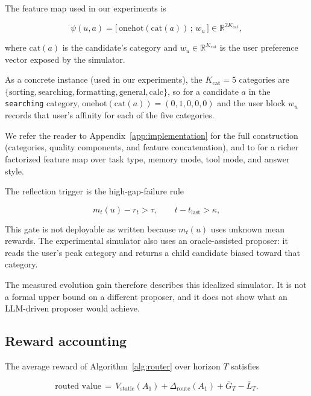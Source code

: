 \documentclass{article} %
\begin{document}
The feature map used in our experiments is

\begin{equation}
\label{eq:method-feat}
\psi(u,a) = \big[\,\mathrm{onehot}(\mathrm{cat}(a))\,;\, w_u\,\big] \in \mathbb{R}^{2K_{\mathrm{cat}}},
\end{equation}

where $\mathrm{cat}(a)$ is the candidate's category and $w_u \in \mathbb{R}^{K_{\mathrm{cat}}}$ is the user preference vector exposed by the simulator.

As a concrete instance (used in our experiments), the $K_{\mathrm{cat}}=5$ categories are $\{\text{sorting}, \text{searching}, \text{formatting}, \text{general}, \text{calc}\}$, so for a candidate $a$ in the \texttt{searching} category, $\mathrm{onehot}(\mathrm{cat}(a))=(0,1,0,0,0)$ and the user block $w_u$ records that user's affinity for each of the five categories.

We refer the reader to Appendix~\ref{app:implementation} for the full construction (categories, quality components, and feature concatenation), and to \citet{jin2026personalizing} for a richer factorized feature map over task type, memory mode, tool mode, and answer style.

The reflection trigger is the high-gap-failure rule

\begin{equation}
\label{eq:method-trigger}
m_t(u) - r_t > \tau,\qquad t - t_{\mathrm{last}} > \kappa,
\end{equation}

This gate is not deployable as written because $m_t(u)$ uses unknown mean rewards. The experimental simulator also uses an oracle-assisted proposer: it reads the user's peak category and returns a child candidate biased toward that category.

The measured evolution gain therefore describes this idealized simulator. It is not a formal upper bound on a different proposer, and it does not show what an LLM-driven proposer would achieve.

\subsection{Reward accounting}
The average reward of Algorithm~\ref{alg:router} over horizon $T$ satisfies

\begin{equation}
\label{eq:method-thesis}
\text{routed value}
\,=\, V_{\mathrm{static}}(A_1) + \Delta_{\mathrm{route}}(A_1) + \bar G_T - \bar L_T.
\end{equation}
\end{document}
